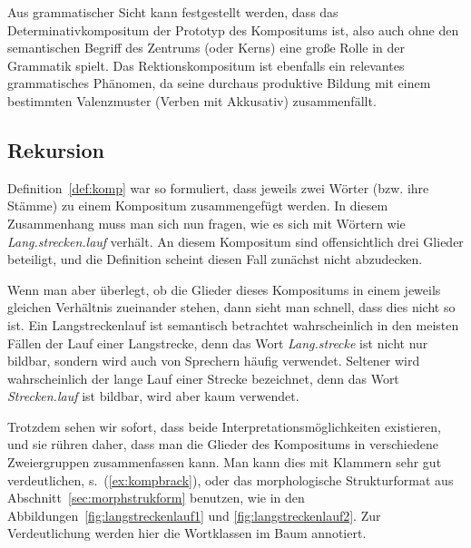 Aus grammatischer Sicht kann festgestellt werden, dass das Determinativkompositum der Prototyp des Kompositums ist, also auch ohne den semantischen Begriff des Zentrums (oder Kerns) eine große Rolle in der Grammatik spielt.
Das Rektionskompositum ist ebenfalls ein relevantes grammatisches Phänomen, da seine durchaus produktive Bildung mit einem bestimmten Valenzmuster (Verben mit Akkusativ) zusammenfällt.

\subsection{Rekursion}

\label{sec:rekursion}


Definition~\ref{def:komp} war so formuliert, dass jeweils zwei Wörter (bzw. ihre Stämme) zu einem Kompositum zusammengefügt werden.
In diesem Zusammenhang muss man sich nun fragen, wie es sich mit Wörtern wie \textit{Lang.strecken.lauf} verhält.
An diesem Kompositum sind offensichtlich drei Glieder beteiligt, und die Definition scheint diesen Fall zunächst nicht abzudecken.

Wenn man aber überlegt, ob die Glieder dieses Kompositums in einem jeweils gleichen Verhältnis zueinander stehen, dann sieht man schnell, dass dies nicht so ist.
Ein Langstreckenlauf ist semantisch betrachtet wahrscheinlich in den meisten Fällen der Lauf einer Langstrecke, denn das Wort \textit{Lang.strecke} ist nicht nur bildbar, sondern wird auch von Sprechern häufig verwendet.
Seltener wird wahrscheinlich der lange Lauf einer Strecke bezeichnet, denn das Wort \textit{Strecken.lauf} ist bildbar, wird aber kaum verwendet.

Trotzdem sehen wir sofort, dass beide Interpretationsmöglichkeiten existieren, und sie rühren daher, dass man die Glieder des Kompositums in verschiedene Zweiergruppen zusammenfassen kann.
Man kann dies mit Klammern sehr gut verdeutlichen, s.\ (\ref{ex:kompbrack}), oder das morphologische Strukturformat aus Abschnitt~\ref{sec:morphstrukform} benutzen, wie in den Abbildungen~\ref{fig:langstreckenlauf1} und \ref{fig:langstreckenlauf2}.
Zur Verdeutlichung werden hier die Wortklassen im Baum annotiert.

\begin{exe}
  \ex\label{ex:kompbrack}\begin{xlist}
  \end{xlist}
\end{exe}

